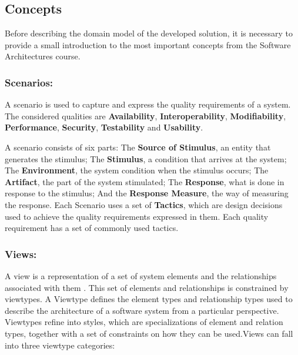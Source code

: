 \documentclass{llncs}
\begin{document}
\subsection{Concepts}
\label{domainModel:SAConcepts}
Before describing the domain model of the developed solution, it is necessary to provide a small introduction to the most important concepts from the Software Architectures course.
\subsubsection{Scenarios:}
\label{SAConcepts:Scenarios}
A scenario is used to capture and express the quality requirements of a system. The considered qualities are \textbf{Availability}, \textbf{Interoperability}, \textbf{Modifiability}, \textbf{Performance}, \textbf{Security}, \textbf{Testability} and \textbf{Usability}.

A scenario consists of six parts\cite{bass2003software}: The \textbf{Source of Stimulus}, an entity that generates the stimulus; The \textbf{Stimulus}, a condition that arrives at the system; The \textbf{Environment}, the system condition when the stimulus occurs; The \textbf{Artifact}, the part of the system stimulated; The \textbf{Response}, what is done in response to the stimulus; And the \textbf{Response Measure}, the way of measuring the response. Each Scenario uses a set of \textbf{Tactics}, which are design decisions used to achieve the quality requirements expressed in them. Each quality requirement has a set of commonly used tactics.

\subsubsection{Views:}
\label{SAConcepts:Views}
A view is a representation of a set of system elements and the relationships associated with them \cite{clements2003documenting}. This set of elements and relationships is constrained by viewtypes.
A Viewtype defines the element types and relationship types used to describe the architecture of a software system from a particular perspective. Viewtypes refine into styles, which are specializations of element and relation types, together with a set of constraints on how they can be used.Views can fall into three viewtype categories: 
\end{document}
